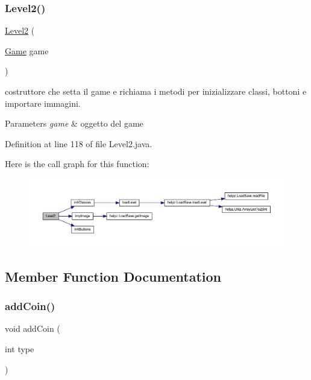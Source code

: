 \subsubsection{\texorpdfstring{Level2()}{Level2()}}
{\footnotesize\ttfamily \hyperlink{classscenes_1_1_level2}{Level2} (\begin{DoxyParamCaption}\item[{\hyperlink{classprogetto_1_1_game}{Game}}]{game }\end{DoxyParamCaption})}



costruttore che setta il game e richiama i metodi per inizializzare classi, bottoni e importare immagini. 


\begin{DoxyParams}{Parameters}
{\em game} & oggetto del game \\
\hline
\end{DoxyParams}


Definition at line 118 of file Level2.\+java.

Here is the call graph for this function\+:\nopagebreak
\begin{figure}[H]
\begin{center}
\leavevmode
\includegraphics[width=350pt]{classscenes_1_1_level2_a53060fc6a453b337e408bd89a86e32af_cgraph}
\end{center}
\end{figure}


\subsection{Member Function Documentation}
\mbox{\label{classscenes_1_1_level2_a9f0f7dc28e596d2ebcd06e27ef05d9fd}} 
\subsubsection{\texorpdfstring{add\+Coin()}{addCoin()}}
{\footnotesize\ttfamily void add\+Coin (\begin{DoxyParamCaption}\item[{int}]{type }\end{DoxyParamCaption})}




